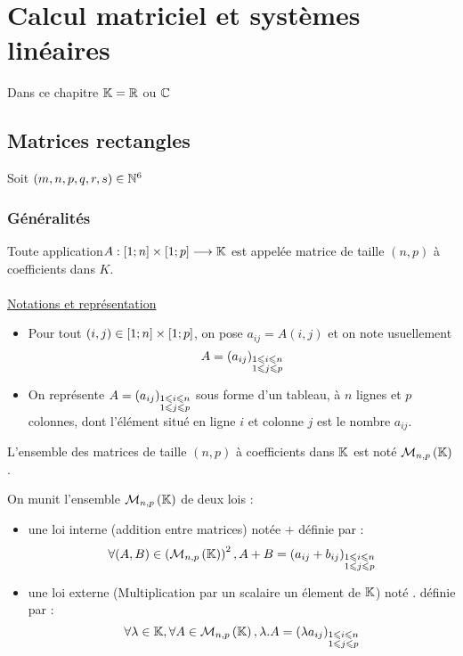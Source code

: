 \chapter{Calcul matriciel et systèmes linéaires}

\minitoc

Dans ce chapitre \(\mathbb{K} = \mathbb{R}\) ou \(\mathbb{C}\)
\section{Matrices rectangles}
Soit \((m,n,p,q,r,s)\in \mathbb{N}^6\)
\subsection{Généralités}
\begin{defi}
    Toute application\( A :\left[1;n\right]\times \left[1;p\right] \longrightarrow \mathbb{K}\) est appelée matrice de taille \((n, p)\) à coefficients dans \(K\).\\~\\
    \underline{Notations et représentation}
    \begin{itemize}
        \item Pour tout \((i, j) \in \left[1;n\right]\times \left[1;p\right] \), on pose \(a_{ij} = A(i, j)\) et on note usuellement
            \[A = \left(a_{ij}\right)_{\substack {1\leqslant i \leqslant n \\ 1\leqslant j \leqslant p}}\]
        \item On représente \(A = {\left(a_{ij}\right)}_{\substack{1\leqslant i \leqslant n \\ 1\leqslant j \leqslant p}}\) sous forme d’un tableau, à \(n\) lignes et \(p\) colonnes, dont l’élément situé en ligne \(i\) et colonne \(j\) est le nombre \(a_{ij}\).
    \end{itemize}
\end{defi}

\begin{defprop}
   L’ensemble des matrices de taille \((n, p)\) à coefficients dans \(\mathbb{K}\) est noté \(\mathcal{M}_{n,p}\left(\mathbb{K}\right)\). 
\end{defprop}

\begin{defprop}
    On munit l'ensemble \(\mathcal{M}_{n,p}\left(\mathbb{K}\right)\) de deux lois :
    \begin{itemize}
        \item une loi interne (addition entre matrices) notée \(+\) définie par :
        \[\forall (A,B) \in \left(\mathcal{M}_{n,p}\left(\mathbb{K}\right)\right)^2, A+B = {\left(a_{ij} + b_{ij}\right)}_{\substack {1\leqslant i \leqslant n \\ 1\leqslant j \leqslant p}}\]
        \item une loi externe (Multiplication par un scalaire \ie un élement de \(\mathbb{K}\)) noté \(.\) définie par : 
        \[\forall \lambda \in \mathbb{K}, \forall A \in \mathcal{M}_{n,p}\left(\mathbb{K}\right), \lambda . A  = \left(\lambda a_{ij}\right)_{\substack {1\leqslant i \leqslant n \\ 1\leqslant j \leqslant p}}\]
    \end{itemize}
\end{defprop}

